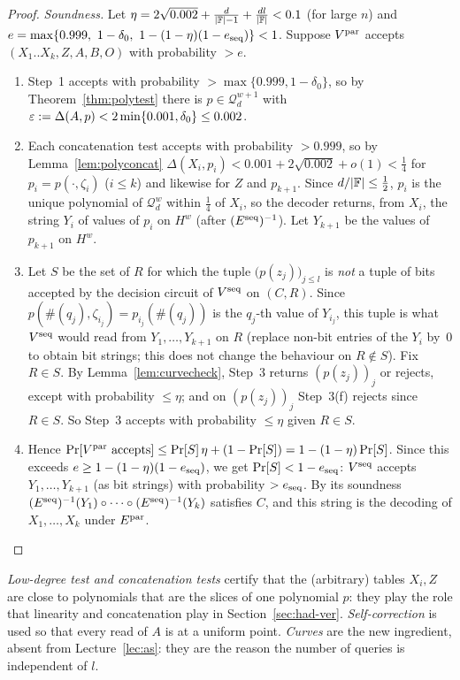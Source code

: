 \begin{proof}
\emph{Soundness.}  Let $\eta=2\sqrt{0.002}+\frac d{|\mathbb{F}|-1}+\frac{dl}{|\mathbb{F}|}<0.1$ (for large $n$) and $e=\max\{0.999,\ 1-\delta_0,\ 1-(1-\eta)(1-e_{\rm seq})\}<1$.  Suppose $V^{\rm par}$ accepts $(X_1..X_k,Z,A,B,O)$ with probability $>e$.
\begin{enumerate}[label=(\roman*)]
  \item Step~1 accepts with probability $>\max\{0.999,1-\delta_0\}$, so by Theorem~\ref{thm:polytest} there is $p\in\mathcal Q^{w+1}_d$ with $\varepsilon:=\Delta(A,p)<2\min\{0.001,\delta_0\}\le0.002$.
  \item Each concatenation test accepts with probability $>0.999$, so by Lemma~\ref{lem:polyconcat} $\Delta(X_i,p_i)<0.001+2\sqrt{0.002}+o(1)<\tfrac14$ for $p_i=p(\cdot,\zeta_i)$ ($i\le k$) and likewise for $Z$ and $p_{k+1}$.  Since $d/|\mathbb{F}|\le\tfrac12$, $p_i$ is the unique polynomial of $\mathcal Q^w_d$ within $\tfrac14$ of $X_i$, so the decoder returns, from $X_i$, the string $Y_i$ of values of $p_i$ on $H^w$ (after $(E^{\rm seq})^{-1}$).  Let $Y_{k+1}$ be the values of $p_{k+1}$ on $H^w$.
  \item Let $S$ be the set of $R$ for which the tuple $\bigl(p(z_j)\bigr)_{j\le l}$ is \emph{not} a tuple of bits accepted by the decision circuit of $V^{\rm seq}$ on $(C,R)$.  Since $p(\#(q_j),\zeta_{i_j})=p_{i_j}(\#(q_j))$ is the $q_j$-th value of $Y_{i_j}$, this tuple is what $V^{\rm seq}$ would read from $Y_1,\dots,Y_{k+1}$ on $R$ (replace non-bit entries of the $Y_i$ by~$0$ to obtain bit strings; this does not change the behaviour on $R\notin S$).  Fix $R\in S$.
        By Lemma~\ref{lem:curvecheck}, Step~3 returns $(p(z_j))_j$ or rejects, except with probability $\le\eta$; and on $(p(z_j))_j$ Step~3(f) rejects since $R\in S$.  So Step~3 accepts with probability $\le\eta$ given $R\in S$.
  \item Hence $\Pr[V^{\rm par}\text{ accepts}]\le\Pr[S]\,\eta+(1-\Pr[S])=1-(1-\eta)\Pr[S]$.  Since this exceeds $e\ge1-(1-\eta)(1-e_{\rm seq})$, we get $\Pr[S]<1-e_{\rm seq}$: $V^{\rm seq}$ accepts $Y_1,\dots,Y_{k+1}$ (as bit strings) with probability $>e_{\rm seq}$.
        By its soundness $(E^{\rm seq})^{-1}(Y_1)\circ\cdots\circ(E^{\rm seq})^{-1}(Y_k)$ satisfies $C$, and this string is the decoding of $X_1,\dots,X_k$ under $E^{\rm par}$.\qedhere
\end{enumerate}
\end{proof}

\begin{remark}
\emph{Low-degree test and concatenation tests} certify that the (arbitrary) tables $X_i,Z$ are close to polynomials that are the slices of one polynomial $p$: they play the role that linearity and concatenation play in Section~\ref{sec:had-ver}.
\emph{Self-correction} is used so that every read of $A$ is at a uniform point.  \emph{Curves} are the new ingredient, absent from Lecture~\ref{lec:as}: they are the reason the number of queries is independent of $l$.
\end{remark}



